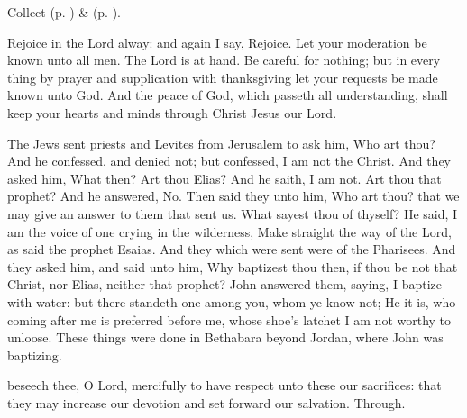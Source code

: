 \begin{rubric}
     Collect  (p. \pageref{AdventICollect}) \&   (p. \pageref{SPMaryInAdvent}).
\end{rubric}

 Rejoice in the Lord alway: and again I say, Rejoice. Let your moderation be known unto all men. The Lord is at hand. Be careful for nothing; but in every thing by prayer and supplication with thanksgiving let your requests be made known unto God. And the peace of God, which passeth all understanding, shall keep your hearts and minds through Christ Jesus our Lord.



\clearpage
{}
 The Jews sent priests and Levites from Jerusalem to ask him, Who art thou? And he confessed, and denied not; but confessed, I am not the Christ. And they asked him, What then? Art thou Elias? And he saith, I am not. Art thou that prophet? And he answered, No. Then said they unto him, Who art thou? that we may give an answer to them that sent us. What sayest thou of thyself? He said, I am the voice of one crying in the wilderness, Make straight the way of the Lord, as said the prophet Esaias. And they which were sent were of the Pharisees. And they asked him, and said unto him, Why baptizest thou then, if thou be not that Christ, nor Elias, neither that prophet? John answered them, saying, I baptize with water: but there standeth one among you, whom ye know not; He it is, who coming after me is preferred before me, whose shoe's latchet I am not worthy to unloose. These things were done in Bethabara beyond Jordan, where John was baptizing.


\secret
{} beseech thee, O Lord, mercifully to have respect unto these our sacrifices: that they may increase our devotion and set forward our salvation. Through.

